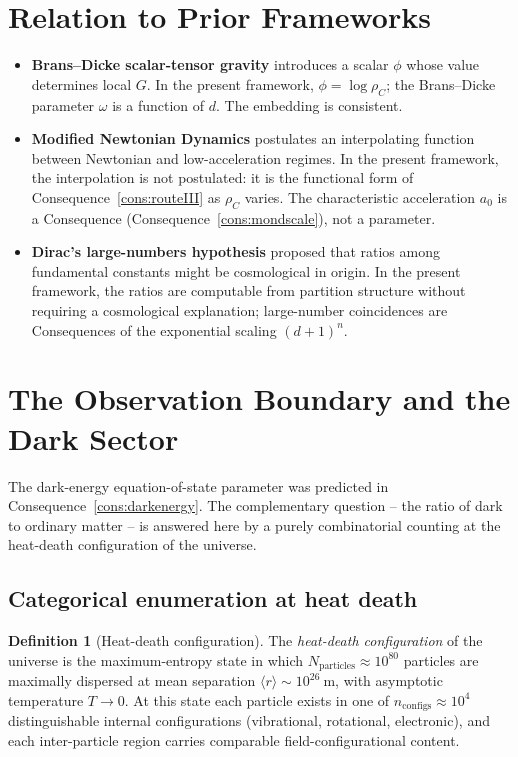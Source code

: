 \documentclass[11pt,twocolumn,a4paper]{article}
\theoremstyle{axiomstyle}
\theoremstyle{conseqstyle}
\theoremstyle{definition}
\newtheorem{definition}{Definition}
\theoremstyle{remark}
\begin{document}
\section{Relation to Prior Frameworks}
\label{sec:Grelation}

\begin{itemize}
\item \textbf{Brans--Dicke scalar-tensor gravity} \citep{brans1961} introduces a scalar $\phi$ whose value determines local $G$. In the present framework, $\phi=\log\rho_{C}$; the Brans--Dicke parameter $\omega$ is a function of $d$. The embedding is consistent.
\item \textbf{Modified Newtonian Dynamics} \citep{milgrom1983,famaey2012} postulates an interpolating function between Newtonian and low-acceleration regimes. In the present framework, the interpolation is not postulated: it is the functional form of Consequence~\ref{cons:routeIII} as $\rho_{C}$ varies. The characteristic acceleration $a_{0}$ is a Consequence (Consequence~\ref{cons:mondscale}), not a parameter.
\item \textbf{Dirac's large-numbers hypothesis} \citep{dirac1937} proposed that ratios among fundamental constants might be cosmological in origin. In the present framework, the ratios are computable from partition structure without requiring a cosmological explanation; large-number coincidences are Consequences of the exponential scaling $(d+1)^{n}$.
\end{itemize}

\section{The Observation Boundary and the Dark Sector}
\label{sec:observationboundary}

The dark-energy equation-of-state parameter was predicted in Consequence~\ref{cons:darkenergy}. The complementary question -- the ratio of dark to ordinary matter -- is answered here by a purely combinatorial counting at the heat-death configuration of the universe.

\subsection{Categorical enumeration at heat death}

\begin{definition}[Heat-death configuration]\label{def:heatdeath}
The \emph{heat-death configuration} of the universe is the maximum-entropy state in which $N_{\mathrm{particles}}\approx 10^{80}$ particles are maximally dispersed at mean separation $\langle r\rangle\sim 10^{26}~\mathrm{m}$, with asymptotic temperature $T\to 0$. At this state each particle exists in one of $n_{\mathrm{configs}}\approx 10^{4}$ distinguishable internal configurations (vibrational, rotational, electronic), and each inter-particle region carries comparable field-configurational content.
\end{definition}
\end{document}
